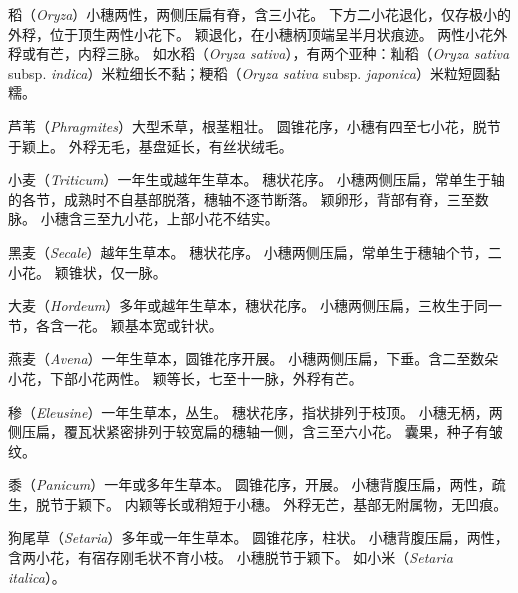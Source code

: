 \documentclass[11pt]{article}
\begin{document}
\begin{sloppypar}
\par

稻（\textit{Oryza}）小穗两性，两侧压扁有脊，含三小花。
下方二小花退化，仅存极小的外稃，位于顶生两性小花下。
颖退化，在小穗柄顶端呈半月状痕迹。
两性小花外稃或有芒，内稃三脉。
如水稻（\textit{Oryza sativa}），有两个亚种：籼稻（\textit{Oryza sativa} subsp. \textit{indica}）米粒细长不黏；粳稻（\textit{Oryza sativa} subsp. \textit{japonica}）米粒短圆黏糯。

\par

芦苇（\textit{Phragmites}）大型禾草，根茎粗壮。
圆锥花序，小穗有四至七小花，脱节于颖上。
外稃无毛，基盘延长，有丝状绒毛。

\par

小麦（\textit{Triticum}）一年生或越年生草本。
穗状花序。
小穗两侧压扁，常单生于轴的各节，成熟时不自基部脱落，穗轴不逐节断落。
颖卵形，背部有脊，三至数脉。
小穗含三至九小花，上部小花不结实。

\par

黑麦（\textit{Secale}）越年生草本。
穗状花序。
小穗两侧压扁，常单生于穗轴个节，二小花。
颖锥状，仅一脉。

\par

大麦（\textit{Hordeum}）多年或越年生草本，穗状花序。
小穗两侧压扁，三枚生于同一节，各含一花。
颖基本宽或针状。

\par

燕麦（\textit{Avena}）一年生草本，圆锥花序开展。
小穗两侧压扁，下垂。含二至数朵小花，下部小花两性。
颖等长，七至十一脉，外稃有芒。

\par

䅟（\textit{Eleusine}）一年生草本，丛生。
穗状花序，指状排列于枝顶。
小穗无柄，两侧压扁，覆瓦状紧密排列于较宽扁的穗轴一侧，含三至六小花。
囊果，种子有皱纹。

\par

黍（\textit{Panicum}）一年或多年生草本。
圆锥花序，开展。
小穗背腹压扁，两性，疏生，脱节于颖下。
内颖等长或稍短于小穗。
外稃无芒，基部无附属物，无凹痕。

\par

狗尾草（\textit{Setaria}）多年或一年生草本。
圆锥花序，柱状。
小穗背腹压扁，两性，含两小花，有宿存刚毛状不育小枝。
小穗脱节于颖下。
如小米（\textit{Setaria italica}）。


\end{sloppypar}
\end{document}
